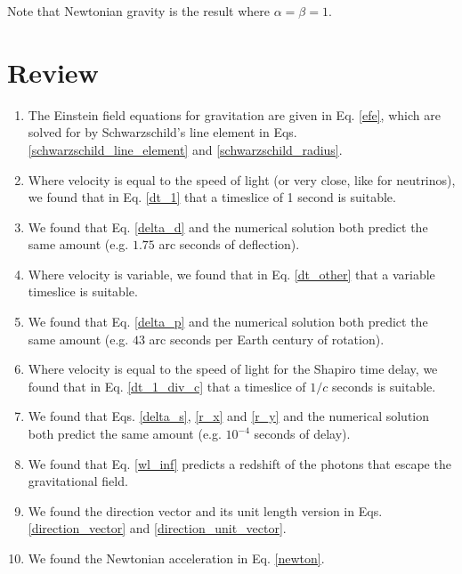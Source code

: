 \documentclass[12pt]{article}
\begin{document}
Note that Newtonian gravity is the result where $\alpha = \beta = 1$.





\section {Review}

\begin{enumerate}

\item
The Einstein field equations for gravitation are given in Eq. \ref{efe}, which are solved for by Schwarzschild's line element in Eqs. \ref{schwarzschild_line_element} and \ref{schwarzschild_radius}.

\item
Where velocity is equal to the speed of light (or very close, like for neutrinos), we found that in Eq. \ref{dt_1} that a timeslice of 1 second is suitable.

\item
We found that Eq. \ref{delta_d} and the numerical solution both predict the same amount (e.g. $1.75$ arc seconds of deflection).

\item
Where velocity is variable, we found that in Eq. \ref{dt_other} that a variable timeslice is suitable.

\item
We found that Eq. \ref{delta_p} and the numerical solution both predict the same amount (e.g. $43$ arc seconds per Earth century of rotation).

\item
Where velocity is equal to the speed of light for the Shapiro time delay, we found that in Eq. \ref{dt_1_div_c} that a timeslice of $1/c$ seconds is suitable.

\item 
We found that Eqs. \ref{delta_s}, \ref{r_x} and \ref{r_y} and the numerical solution both predict the same amount (e.g. $10^{-4}$ seconds of delay).

\item
We found that Eq. \ref{wl_inf} predicts a redshift of the photons that escape the gravitational field.


\item
We found the direction vector and its unit length version in Eqs. \ref{direction_vector} and \ref{direction_unit_vector}.

\item
We found the Newtonian acceleration in Eq. \ref{newton}.


\end{enumerate}
\end{document}

